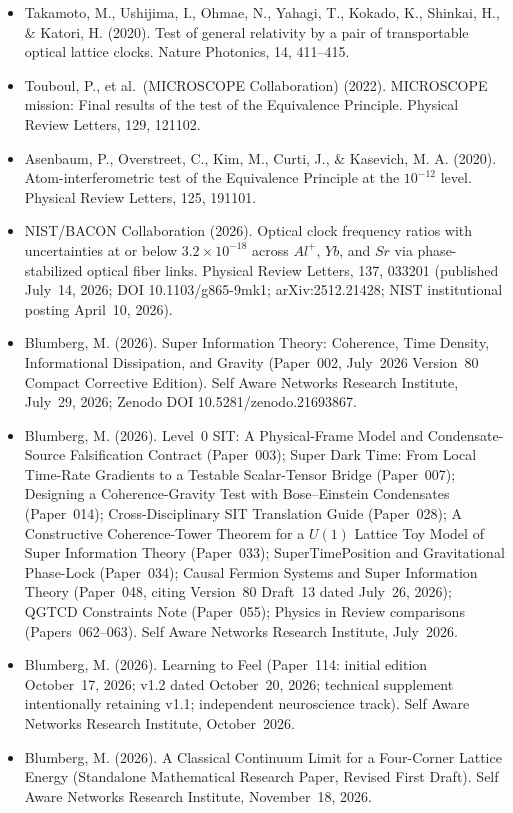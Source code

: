 \documentclass[american,11pt,letterpaper]{article}
\def\mathrm#1{#1}%
\def\texttt#1{#1}%
\def\emph#1{#1}%
\begin{document}
\begin{itemize}
\item Takamoto, M., Ushijima, I., Ohmae, N., Yahagi, T., Kokado, K., Shinkai, H., \& Katori, H. (2020). Test of general relativity by a pair of transportable optical lattice clocks. \emph{Nature Photonics}, 14, 411--415.
\item Touboul, P., et al.\ (MICROSCOPE Collaboration) (2022). MICROSCOPE mission: Final results of the test of the Equivalence Principle. \emph{Physical Review Letters}, 129, 121102.
\item Asenbaum, P., Overstreet, C., Kim, M., Curti, J., \& Kasevich, M. A. (2020). Atom-interferometric test of the Equivalence Principle at the $10^{-12}$ level. \emph{Physical Review Letters}, 125, 191101.
\item NIST/BACON Collaboration (2026). Optical clock frequency ratios with uncertainties at or below $3.2\times 10^{-18}$ across $\mathrm{Al}^+$, $\mathrm{Yb}$, and $\mathrm{Sr}$ via phase-stabilized optical fiber links. \emph{Physical Review Letters}, 137, 033201 (published July~14, 2026; DOI \texttt{10.1103/g865-9mk1}; \texttt{arXiv:2512.21428}; NIST institutional posting April~10, 2026).
\item Blumberg, M. (2026). \emph{Super Information Theory: Coherence, Time Density, Informational Dissipation, and Gravity} (Paper~002, July~2026 Version~80 Compact Corrective Edition). Self Aware Networks Research Institute, July~29, 2026; Zenodo DOI \texttt{10.5281/zenodo.21693867}.
\item Blumberg, M. (2026). \emph{Level~0 SIT: A Physical-Frame Model and Condensate-Source Falsification Contract} (Paper~003); \emph{Super Dark Time: From Local Time-Rate Gradients to a Testable Scalar-Tensor Bridge} (Paper~007); \emph{Designing a Coherence-Gravity Test with Bose--Einstein Condensates} (Paper~014); \emph{Cross-Disciplinary SIT Translation Guide} (Paper~028); \emph{A Constructive Coherence-Tower Theorem for a $U(1)$ Lattice Toy Model of Super Information Theory} (Paper~033); \emph{SuperTimePosition and Gravitational Phase-Lock} (Paper~034); \emph{Causal Fermion Systems and Super Information Theory} (Paper~048, citing Version~80 Draft~13 dated July~26, 2026); \emph{QGTCD Constraints Note} (Paper~055); \emph{Physics in Review} comparisons (Papers~062--063). Self Aware Networks Research Institute, July~2026.
\item Blumberg, M. (2026). \emph{Learning to Feel} (Paper~114: initial edition October~17, 2026; v1.2 dated October~20, 2026; technical supplement intentionally retaining v1.1; independent neuroscience track). Self Aware Networks Research Institute, October~2026.
\item Blumberg, M. (2026). \emph{A Classical Continuum Limit for a Four-Corner Lattice Energy} (Standalone Mathematical Research Paper, Revised First Draft). Self Aware Networks Research Institute, November~18, 2026.

\end{itemize}
\end{document}
